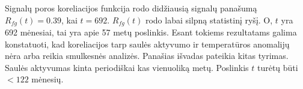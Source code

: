 Signalų poros koreliacijos funkcija rodo didžiausią signalų panašumą \( R_{fg}(t) = 0.39 \), kai \( t = 692 \).
\( R_{fg}(t)\) rodo labai silpną statistinį ryšį. O, \(t\) yra 692 mėnesiai, tai yra apie 57 metų poslinkis.
Esant tokiems rezultatams galima konstatuoti, kad koreliacijos tarp saulės aktyvumo ir temperatūros anomalijų nėra arba reikia smulkesnės analizės.
Panašias išvadas pateikia kitas tyrimas\cite{temp_study}.
Saulės aktyvumas kinta periodiškai kas vienuoliką metų. Poslinkis \(t\) turėtų būti \(< 122 \) mėnesių.
